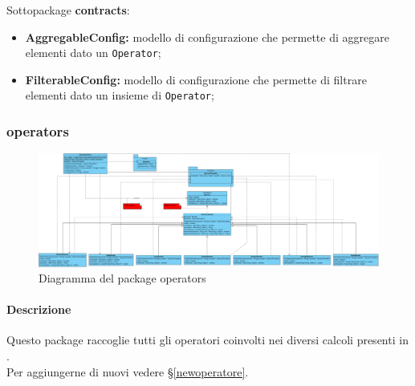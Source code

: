 		Sottopackage \textbf{contracts}:
		\begin{itemize}
			\item \textbf{AggregableConfig:} modello di configurazione che permette di aggregare elementi
				dato un \verb=Operator=;			
			\item \textbf{FilterableConfig:} modello di configurazione che permette di filtrare elementi
				dato un insieme di \verb=Operator=;	
		\end{itemize}

\newpage
		
	\subsubsection{operators}
	
		\begin{figure}[H]
           	\centering
            \includegraphics[width=\textwidth]{./img/DiagrammiClasse/operators.png}
            \caption[Diagramma del package operators]{Diagramma del package operators}
       	\end{figure}
		
		\paragraph*{Descrizione}
			Questo package raccoglie tutti gli operatori coinvolti nei diversi calcoli presenti in
			\ProjectName{}.\\
			Per aggiungerne di nuovi vedere §\ref{newoperatore}.
			
